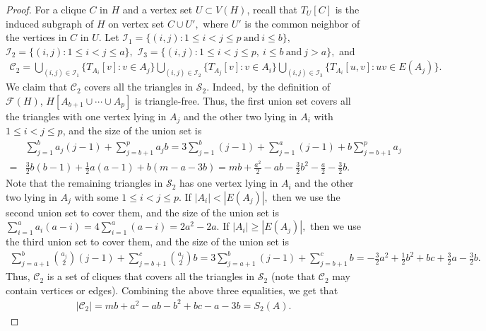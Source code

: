 \documentclass[11pt,a4paper]{article}
\newcommand{\dC}{{\mathcal{C}}}
\newcommand{\dF}{{\mathcal{F}}}
\newcommand{\dS}{{\mathcal{S}}}
\begin{document}
\begin{proof}
For a clique $C$ in $H$ and a vertex set $U\subset V(H)$, recall that $T_U[C]$ is the induced subgraph of $H$ on vertex set $C\cup U',$ where $U'$ is the common neighbor of the vertices in $C$ in $U.$   
Let $\mathcal{I}_1=\{(i,j): 1\le i<j\le p\ \text{and}\ i\le b \},$
    $\mathcal{I}_2=\{(i,j): 1\le i<j\le a\},$ 
    $\mathcal{I}_3=\{(i,j): 1\le i<j\le p,\ i\le b\ \text{and}\ j>a\},$ and 
\begin{align*}
\dC_2=\bigcup\limits_{(i,j)\in\mathcal{I}_1} \{T_{A_i}[v]: v\in A_j\}
      \bigcup\limits_{(i,j)\in\mathcal{I}_2} \{T_{A_j}[v]: v\in A_i\}
      \bigcup\limits_{(i,j)\in\mathcal{I}_3} \{T_{A_i}[u,v]: uv \in E(A_j)\}.
\end{align*}
We claim that $\dC_2$ covers all the triangles in $\dS_2.$ 
Indeed, by %
the definition of $\dF(H)$, $H[A_{b+1}\cup\cdots\cup A_p]$ is triangle-free.
Thus, the first union set covers all the triangles with one vertex lying in $A_j$ and the other two lying in $A_i$ with $1\leq i<j\leq p$, and the size of the union set is 
\begin{align*}
&\sum_{j=1}^ba_j(j-1)+\sum_{j=b+1}^pa_jb=3\sum_{j=1}^b (j-1)+\sum_{j=1}^a (j-1)+b\sum_{j=b+1}^pa_j \nonumber \\
=&\frac{3}{2}b(b-1)+\frac{1}{2}a(a-1)+b(m-a-3b)=
mb+\frac{a^2}{2}-ab-\frac{3}{2}b^2-\frac {a}{2}-\frac{3}{2}b.
\end{align*} 
Note that the remaining triangles in $\dS_2$ has one vertex lying in $A_i$ and the other two lying in $A_j$ with some $1\le i<j\le p$.
If $|A_i|<|E(A_j)|,$ then we use the second union set to cover them,
and the size of the union set is
$\sum_{i=1}^{a}a_i(a-i)=4\sum_{i=1}^{a}(a-i)=2a^2-2a.$
If $|A_i|\ge |E(A_j)|,$ then we use the third union set to cover them,
and the size of the union set is
\begin{align*}
\sum_{j=a+1}^b\binom{a_j}{2}(j-1)+\sum_{j=b+1}^c\binom{a_j}{2}b
=3\sum_{j=a+1}^b (j-1)+\sum_{j=b+1}^c b=-\frac{3}{2}a^2+ \frac{1}{2}b^2 +bc +\frac 3 2a-\frac 3 2 b.
\end{align*}
Thus, $\dC_2$ is a set of cliques that covers all the triangles in $\dS_2$ (note that $\dC_2$ may contain vertices or edges).
Combining the above three equalities, we get that 
\begin{align*}
    |\dC_2|= mb+a^2-ab-b^2+bc-a-3b=S_2(A).
\end{align*}
    

\end{proof}
\end{document}
